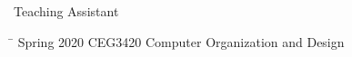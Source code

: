 
\begin{rSection}{Teaching Assistant}
\begin{tabbing}
\hspace{1.0in}\= \kill
Spring 2020    \>  CEG3420 Computer Organization and Design \\
\end{tabbing}
\end{rSection}

